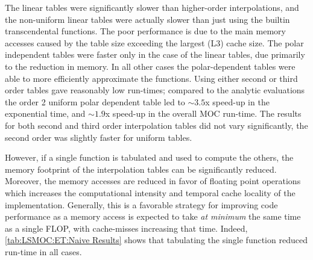 {{{{        The linear tables were significantly slower than higher-order interpolations, and the non-uniform linear tables were actually slower than just using the builtin transcendental functions.
        The poor performance is due to the main memory accesses caused by the table size exceeding the largest (L3) cache size.
        The polar independent tables were faster only in the case of the linear tables, due primarily to the reduction in memory.
        In all other cases the polar-dependent tables were able to more efficiently approximate the functions.
        Using either second or third order tables gave reasonably low run-times; compared to the analytic evaluations the order 2 uniform polar dependent table led to $\sim 3.5$x speed-up in the exponential time, and $\sim 1.9$x speed-up in the overall \ac{MOC} run-time.
        The results for both second and third order interpolation tables did not vary significantly, the second order was slightly faster for uniform tables.

        However, if a single function is tabulated and used to compute the others, the memory footprint of the interpolation tables can be significantly reduced.
        Moreover, the memory accesses are reduced in favor of floating point operations which increases the computational intensity and temporal cache locality of the implementation.
        Generally, this is a favorable strategy for improving code performance as a memory access is expected to take \emph{at minimum} the same time as a single \ac{FLOP}, with cache-misses increasing that time.
        Indeed, \cref{tab:LSMOC:ET:Naive Results} shows that tabulating the single function reduced run-time in all cases.

}}}}
